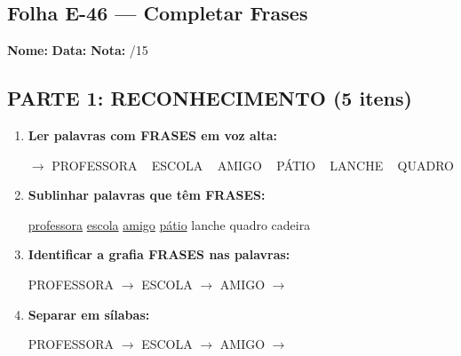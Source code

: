 \subsection{Folha E-46 --- Completar Frases}
\begin{exercicio}



\noindent\textbf{Nome:} \underline{\hspace{3.2cm}} \quad \textbf{Data:} \underline{\hspace{1.6cm}} \quad \textbf{Nota:} \underline{\hspace{0.9cm}}/15


\subsection*{PARTE 1: RECONHECIMENTO (5 itens)}

\begin{enumerate}

  \item \textbf{Ler palavras com FRASES em voz alta:}
  \begin{center}
  $\rightarrow$ PROFESSORA ~ ESCOLA ~ AMIGO ~ PÁTIO ~ LANCHE ~ QUADRO
  \end{center}

  \item \textbf{Sublinhar palavras que têm FRASES:}

\begin{center}
  \uline{professora} \quad \uline{escola} \quad \uline{amigo} \quad \uline{pátio} \quad lanche \quad quadro \quad cadeira
\end{center}

  \item \textbf{Identificar a grafia FRASES nas palavras:}
  \begin{center}
  PROFESSORA $\rightarrow$ \underline{\hspace{1cm}} \quad ESCOLA $\rightarrow$ \underline{\hspace{1cm}} \quad AMIGO $\rightarrow$ \underline{\hspace{1cm}}
  \end{center}

  \item \textbf{Separar em sílabas:}
  \begin{center}
  PROFESSORA $\rightarrow$ \underline{\hspace{1.2cm}} \quad ESCOLA $\rightarrow$ \underline{\hspace{1.2cm}} \quad AMIGO $\rightarrow$ \underline{\hspace{1.2cm}}
  \end{center}


\end{enumerate}
\end{exercicio}
